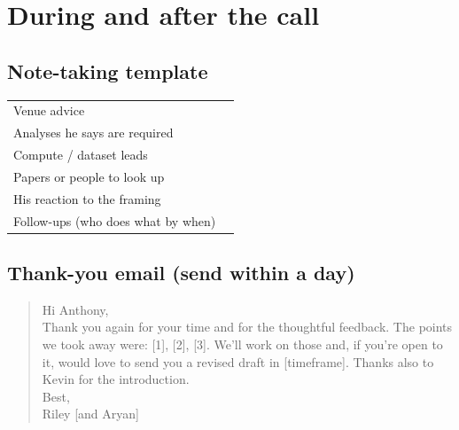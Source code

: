 \documentclass[10.5pt]{article}
\begin{document}
\section{During and after the call}

\subsection*{Note-taking template}
\begin{tabular}{@{}p{4cm}p{11.5cm}@{}}
\toprule
Venue advice & \\[14pt]
Analyses he says are required & \\[14pt]
Compute / dataset leads & \\[14pt]
Papers or people to look up & \\[14pt]
His reaction to the framing & \\[14pt]
Follow-ups (who does what by when) & \\[14pt]
\bottomrule
\end{tabular}

\subsection*{Thank-you email (send within a day)}
\begin{quote}
Hi Anthony,\\
Thank you again for your time and for the thoughtful feedback. The points we took away were: [1], [2], [3].
We'll work on those and, if you're open to it, would love to send you a revised draft in [timeframe].
Thanks also to Kevin for the introduction.\\
Best,\\ Riley [and Aryan]
\end{quote}

\end{document}

